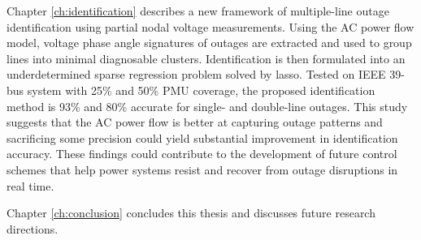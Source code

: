 Chapter \ref{ch:identification} describes a new framework of multiple-line outage identification using partial nodal voltage measurements. Using the AC power flow model, voltage phase angle signatures of outages are extracted and used to group lines into minimal diagnosable clusters. Identification is then formulated into an underdetermined sparse regression problem solved by lasso. Tested on IEEE 39-bus system with 25\% and 50\% PMU coverage, the proposed identification method is 93\% and 80\% accurate for single- and double-line outages. 
This study suggests that the AC power flow is better at capturing outage patterns and sacrificing some precision could yield substantial improvement in identification accuracy. These findings could contribute to the development of future control schemes that help power systems resist and recover from outage disruptions in real time. 


Chapter \ref{ch:conclusion} concludes this thesis and discusses future research directions.
